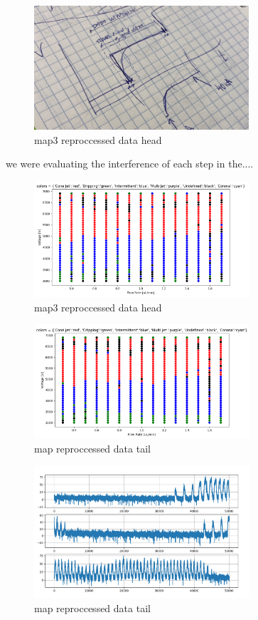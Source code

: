     \begin{multicols}{2}

        \begin{figure}[H]
            \center
            \includegraphics[width=8cm]{images/idea.png}
            \caption{ map3 reproccessed data head }
        \end{figure}



    we were evaluating the interference of each step in the....


        \begin{figure}[H]
            \center
            \includegraphics[width=8cm]{images/map3_reproccessed_data_head.png}
            \caption{ map3 reproccessed data head }
        \end{figure}

        \begin{figure}[H]
            \center
            \includegraphics[width=8cm]{images/map3_reproccessed_data_tail.png}
            \caption{ map reproccessed data tail }
        \end{figure}


        \begin{figure}[H]
            \center
            \includegraphics[width=8cm]{images/data_samples.png}
            \caption{ map reproccessed data tail }
        \end{figure}


\end{multicols}
